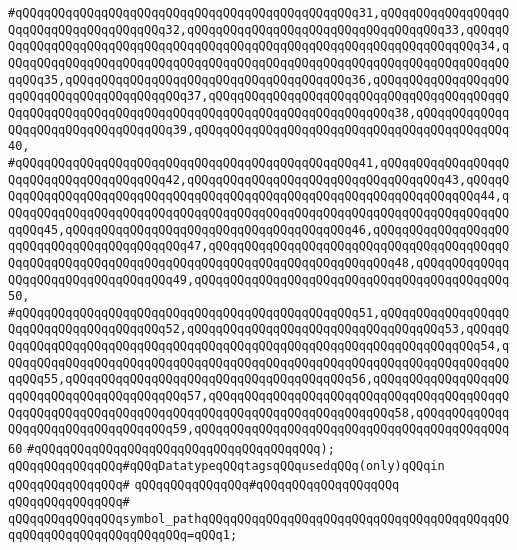 \verb|#qQQqqQQqqQQqqQQqqQQqqQQqqQQqqQQqqQQqqQQqqQQqqQQq31,qQQqqQQqqQQqqQQqqQQqqQQqqQQqqQQqqQQqqQQq32,qQQqqQQqqQQqqQQqqQQqqQQqqQQqqQQqqQQq33,qQQqqQQqqQQqqQQqqQQqqQQqqQQqqQQqqQQqqQQqqQQqqQQqqQQqqQQqqQQqqQQqqQQqqQQq34,qQQqqQQqqQQqqQQqqQQqqQQqqQQqqQQqqQQqqQQqqQQqqQQqqQQqqQQqqQQqqQQqqQQqqQQqqQQq35,qQQqqQQqqQQqqQQqqQQqqQQqqQQqqQQqqQQqqQQq36,qQQqqQQqqQQqqQQqqQQqqQQqqQQqqQQqqQQqqQQqqQQq37,qQQqqQQqqQQqqQQqqQQqqQQqqQQqqQQqqQQqqQQqqQQqqQQqqQQqqQQqqQQqqQQqqQQqqQQqqQQqqQQqqQQqqQQqqQQqqQQq38,qQQqqQQqqQQqqQQqqQQqqQQqqQQqqQQqqQQq39,qQQqqQQqqQQqqQQqqQQqqQQqqQQqqQQqqQQqqQQqqQQq40,|\newline
\verb|#qQQqqQQqqQQqqQQqqQQqqQQqqQQqqQQqqQQqqQQqqQQqqQQq41,qQQqqQQqqQQqqQQqqQQqqQQqqQQqqQQqqQQqqQQq42,qQQqqQQqqQQqqQQqqQQqqQQqqQQqqQQqqQQq43,qQQqqQQqqQQqqQQqqQQqqQQqqQQqqQQqqQQqqQQqqQQqqQQqqQQqqQQqqQQqqQQqqQQqqQQq44,qQQqqQQqqQQqqQQqqQQqqQQqqQQqqQQqqQQqqQQqqQQqqQQqqQQqqQQqqQQqqQQqqQQqqQQqqQQq45,qQQqqQQqqQQqqQQqqQQqqQQqqQQqqQQqqQQqqQQq46,qQQqqQQqqQQqqQQqqQQqqQQqqQQqqQQqqQQqqQQqqQQq47,qQQqqQQqqQQqqQQqqQQqqQQqqQQqqQQqqQQqqQQqqQQqqQQqqQQqqQQqqQQqqQQqqQQqqQQqqQQqqQQqqQQqqQQqqQQqqQQq48,qQQqqQQqqQQqqQQqqQQqqQQqqQQqqQQqqQQq49,qQQqqQQqqQQqqQQqqQQqqQQqqQQqqQQqqQQqqQQqqQQq50,|\newline
\verb|#qQQqqQQqqQQqqQQqqQQqqQQqqQQqqQQqqQQqqQQqqQQqqQQq51,qQQqqQQqqQQqqQQqqQQqqQQqqQQqqQQqqQQqqQQq52,qQQqqQQqqQQqqQQqqQQqqQQqqQQqqQQqqQQq53,qQQqqQQqqQQqqQQqqQQqqQQqqQQqqQQqqQQqqQQqqQQqqQQqqQQqqQQqqQQqqQQqqQQqqQQq54,qQQqqQQqqQQqqQQqqQQqqQQqqQQqqQQqqQQqqQQqqQQqqQQqqQQqqQQqqQQqqQQqqQQqqQQqqQQq55,qQQqqQQqqQQqqQQqqQQqqQQqqQQqqQQqqQQqqQQq56,qQQqqQQqqQQqqQQqqQQqqQQqqQQqqQQqqQQqqQQqqQQq57,qQQqqQQqqQQqqQQqqQQqqQQqqQQqqQQqqQQqqQQqqQQqqQQqqQQqqQQqqQQqqQQqqQQqqQQqqQQqqQQqqQQqqQQqqQQqqQQq58,qQQqqQQqqQQqqQQqqQQqqQQqqQQqqQQqqQQq59,qQQqqQQqqQQqqQQqqQQqqQQqqQQqqQQqqQQqqQQqqQQq60|\newline
\verb|#qQQqqQQqqQQqqQQqqQQqqQQqqQQqqQQqqQQqqQQq);|\newline
\newline
\newline
\verb|qQQqqQQqqQQqqQQq#qQQqDatatypeqQQqtagsqQQqusedqQQq(only)qQQqin|\newline
\verb|qQQqqQQqqQQqqQQq#|\newline
\verb|qQQqqQQqqQQqqQQq#qQQqqQQqqQQqqQQqqQQq|\newline
\verb|qQQqqQQqqQQqqQQq#|\newline
\verb|qQQqqQQqqQQqqQQqsymbol_pathqQQqqQQqqQQqqQQqqQQqqQQqqQQqqQQqqQQqqQQqqQQqqQQqqQQqqQQqqQQqqQQqqQQq=qQQq1;|\newline
